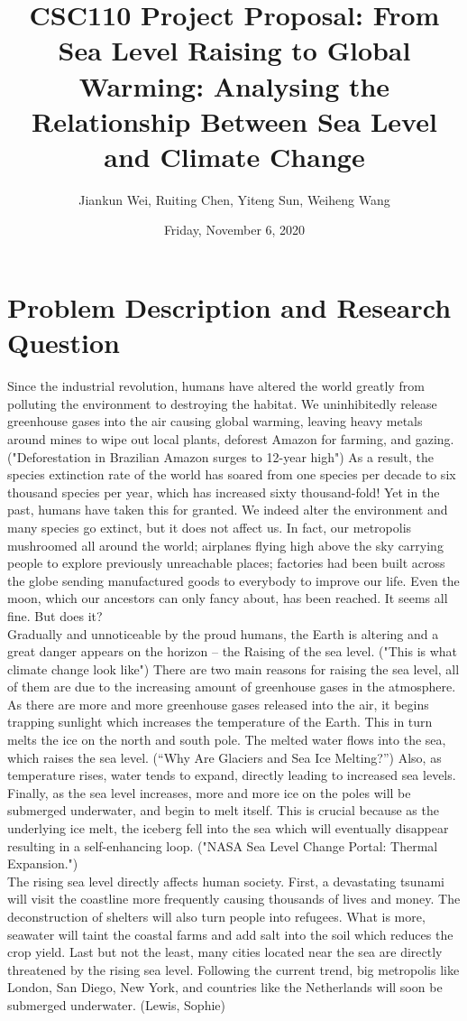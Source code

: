 \documentclass[fontsize=11pt]{article}
\title{CSC110 Project Proposal: From Sea Level Raising to Global Warming: Analysing the Relationship Between Sea Level and Climate Change}
\author{Jiankun Wei, Ruiting Chen, Yiteng Sun, Weiheng Wang}
\date{Friday, November 6, 2020}
\begin{document}
    \maketitle

    \section*{Problem Description and Research Question}

    Since the industrial revolution, humans have altered the world greatly from polluting the environment to destroying the habitat. We uninhibitedly release greenhouse gases into the air causing global warming, leaving heavy metals around mines to wipe out local plants, deforest Amazon for farming, and gazing. ("Deforestation in Brazilian Amazon surges to 12-year high") As a result, the species extinction rate of the world has soared from one species per decade to six thousand species per year, which has increased sixty thousand-fold! Yet in the past, humans have taken this for granted. We indeed alter the environment and many species go extinct, but it does not affect us. In fact, our metropolis mushroomed all around the world; airplanes flying high above the sky carrying people to explore previously unreachable places; factories had been built across the globe sending manufactured goods to everybody to improve our life. Even the moon, which our ancestors can only fancy about, has been reached. It seems all fine. But does it?\\
    Gradually and unnoticeable by the proud humans, the Earth is altering and a great danger appears on the horizon -- the Raising of the sea level. ("This is what climate change look like") There are two main reasons for raising the sea level, all of them are due to the increasing amount of greenhouse gases in the atmosphere. As there are more and more greenhouse gases released into the air, it begins trapping sunlight which increases the temperature of the Earth. This in turn melts the ice on the north and south pole. The melted water flows into the sea, which raises the sea level. (“Why Are Glaciers and Sea Ice Melting?”) Also, as temperature rises, water tends to expand, directly leading to increased sea levels. Finally, as the sea level increases, more and more ice on the poles will be submerged underwater, and begin to melt itself. This is crucial because as the underlying ice melt, the iceberg fell into the sea which will eventually disappear resulting in a self-enhancing loop. ("NASA Sea Level Change Portal: Thermal Expansion.")\\
    The rising sea level directly affects human society. First, a devastating tsunami will visit the coastline more frequently causing thousands of lives and money. The deconstruction of shelters will also turn people into refugees. What is more, seawater will taint the coastal farms and add salt into the soil which reduces the crop yield. Last but not the least, many cities located near the sea are directly threatened by the rising sea level. Following the current trend, big metropolis like London, San Diego, New York, and countries like the Netherlands will soon be submerged underwater. (Lewis, Sophie)\\
\end{document}
